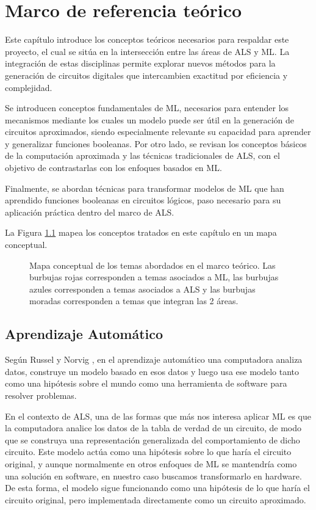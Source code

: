 \chapter{Marco de referencia teórico}

Este capítulo introduce los conceptos teóricos necesarios para respaldar este
proyecto, el cual se sitúa en la intersección entre las áreas de ALS y ML. La
integración de estas disciplinas permite explorar nuevos métodos para la
generación de circuitos digitales que intercambien exactitud por eficiencia y
complejidad.

Se introducen conceptos fundamentales de ML, necesarios para entender los
mecanismos mediante los cuales un modelo puede ser útil en la generación de
circuitos aproximados, siendo especialmente relevante su capacidad para
aprender y generalizar funciones booleanas. Por otro lado, se revisan los
conceptos básicos de la computación aproximada y las técnicas tradicionales de
ALS, con el objetivo de contrastarlas con los enfoques basados en ML.

Finalmente, se abordan técnicas para transformar modelos de ML que han
aprendido funciones booleanas en circuitos lógicos, paso necesario para su
aplicación práctica dentro del marco de ALS.

La Figura \ref{fig:mapa_conceptual} mapea los conceptos tratados en
este capítulo en un mapa conceptual.

\begin{figure}[ht]
  \centering
  
  \caption{Mapa conceptual de los temas abordados en el marco teórico. Las
    burbujas rojas corresponden a temas asociados a ML, las burbujas azules
    corresponden a temas asociados a ALS y las burbujas moradas corresponden a
  temas que integran las 2 áreas.}
  \label{fig:mapa_conceptual}
\end{figure}

\section{Aprendizaje Automático}

Según Russel y Norvig \cite{russell2016artificial}, en el aprendizaje
automático una computadora analiza datos, construye un modelo basado en esos
datos y luego usa ese modelo tanto como una hipótesis sobre el mundo como una
herramienta de software para resolver problemas.

En el contexto de ALS, una de las formas que más nos interesa aplicar ML es
que la computadora analice los datos de la tabla de verdad de un circuito,
de modo que se construya una representación generalizada del comportamiento de
dicho circuito.
Este modelo actúa como una hipótesis sobre lo que haría el circuito original, y
aunque normalmente en otros enfoques de ML se mantendría como una solución en
software, en nuestro caso buscamos transformarlo en hardware. De esta forma, el
modelo sigue funcionando como una hipótesis de lo que haría el circuito
original, pero implementada directamente como un circuito aproximado.

